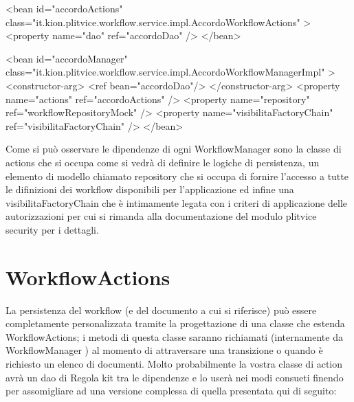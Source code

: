 \begin{xml}
<bean id="accordoActions" class="it.kion.plitvice.workflow.service.impl.AccordoWorkflowActions" >
  <property name="dao" ref="accordoDao" />
</bean>
  
<bean id="accordoManager" class="it.kion.plitvice.workflow.service.impl.AccordoWorkflowManagerImpl" >
   <constructor-arg>
      <ref bean="accordoDao"/>
    </constructor-arg>
        <property name="actions" ref="accordoActions" />
    <property name="repository" ref="workflowRepositoryMock" />
    <property name="visibilitaFactoryChain" ref="visibilitaFactoryChain" />
</bean>
\end{xml}

Come si può osservare le dipendenze di ogni WorkflowManager sono la classe di actions che si occupa come si vedrà di definire le logiche di persistenza, un elemento di modello chiamato repository che si occupa di fornire l'accesso a tutte le difinizioni dei workflow disponibili per l'applicazione ed infine una  visibilitaFactoryChain che è intimamente legata con i criteri di applicazione delle autorizzazioni per cui si rimanda alla documentazione del modulo plitvice security per i dettagli.

\section{WorkflowActions}

La persistenza del workflow (e del documento a cui si riferisce) può essere completamente personalizzata tramite la progettazione di una classe che estenda WorkflowActions; i metodi di questa classe saranno richiamati (internamente da WorkflowManager )  al momento di attraversare una transizione o quando è richiesto un elenco di documenti. 
Molto probabilmente la vostra classe di action avrà un dao di Regola kit tra le dipendenze e lo userà nei modi consueti finendo per assomigliare ad una versione complessa di quella presentata qui di seguito:

